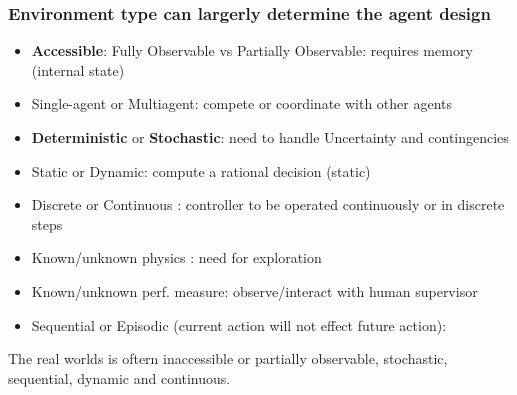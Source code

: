 \documentclass{beamer}
\begin{document}
\begin{frame}
  \frametitle{Environment type can largerly determine the agent design}
  \begin{itemize}
    \item \textbf{Accessible}: Fully Observable vs Partially Observable: requires memory (internal state)
    \item Single-agent or Multiagent: compete or coordinate with other agents
    \item \textbf{Deterministic} or \textbf{Stochastic}: need to handle Uncertainty and contingencies
    \item Static or Dynamic: compute a rational decision (static)
    \item Discrete or Continuous : controller to be operated continuously or in discrete steps
    \item Known/unknown physics : need for exploration
    \item Known/unknown perf. measure: observe/interact with human supervisor
    \item Sequential or Episodic (current action will not effect future action): 
  \end{itemize}
  The real worlds is oftern inaccessible or partially observable, stochastic, sequential, dynamic and continuous.
\end{frame}
\end{document}
